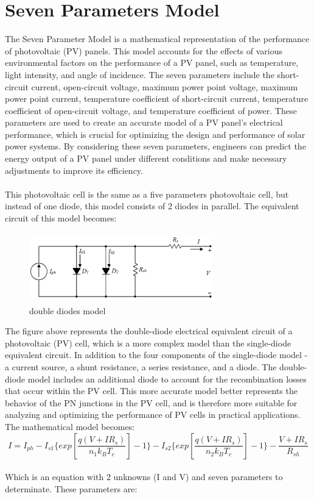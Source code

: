 \documentclass{report}
\begin{document}
\section{Seven Parameters Model}
The Seven Parameter Model is a mathematical representation of the performance of photovoltaic (PV) panels. This model accounts for the effects of various environmental factors on the performance of a PV panel, such as temperature, light intensity, and angle of incidence. The seven parameters include the short-circuit current, open-circuit voltage, maximum power point voltage, maximum power point current, temperature coefficient of short-circuit current, temperature coefficient of open-circuit voltage, and temperature coefficient of power. These parameters are used to create an accurate model of a PV panel's electrical performance, which is crucial for optimizing the design and performance of solar power systems. By considering these seven parameters, engineers can predict the energy output of a PV panel under different conditions and make necessary adjustments to improve its efficiency.\\
\\
This photovoltaic cell is the same as a five parameters photovoltaic cell, but instead of one diode, this model consists of 2 diodes in parallel. 
The equivalent circuit of this model becomes:

\begin{figure}[h!]
  \centering
    \includegraphics[width=8cm, height=3cm] {sevenp.png}
    \caption{double diodes model \cite{kalogiroubook}}
    \label{fig:my_label}
\end{figure}
\hfill \break
The figure above represents the double-diode electrical equivalent circuit of a photovoltaic (PV) cell, which is a more complex model than the single-diode equivalent circuit. In addition to the four components of the single-diode model - a current source, a shunt resistance, a series resistance, and a diode. The double-diode model includes an additional diode to account for the recombination losses that occur within the PV cell. This more accurate model better represents the behavior of the PN junctions in the PV cell, and is therefore more suitable for analyzing and optimizing the performance of PV cells in practical applications.\\
\hfill \break
The mathematical model becomes:\\
\begin{equation}
I = I_{ph} - I_{s1} \{ exp
 \left[  \frac{q(V+IR_{s})}{n_{1}k_{B}T_{c}} \right] - 1 \} - I_{s2} \{ exp
 \left[  \frac{q(V+IR_{s})}{n_{2}k_{B}T_{c}} \right] - 1 \} - \frac{V+IR_{s}}{R_{sh}}
\end{equation}
\\
Which is an equation with 2 unknowns (I and V) and seven parameters to determinate. These parameters are:
\end{document}
